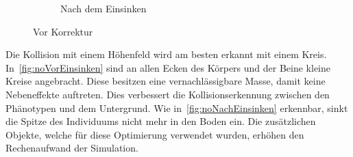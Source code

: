 \begin{figure}[H]
\begin{subfigure}[b]{0.45\textwidth}
          \caption{Nach dem Einsinken\label{fig:nachEinsinken}}
        \end{subfigure}
        \caption{Vor Korrektur}
      \end{figure}

      Die Kollision mit einem Höhenfeld wird am besten erkannt mit einem Kreis.
      In~\vref{fig:noVorEinsinken} sind an allen Ecken des Körpers und der Beine kleine Kreise angebracht.
      Diese besitzen eine vernachlässigbare Masse, damit keine Nebeneffekte auftreten.
      Dies verbessert die Kollisionserkennung zwischen den Phänotypen und dem Untergrund.
      Wie in~\vref{fig:noNachEinsinken} erkennbar, sinkt die Spitze des Individuums nicht mehr in den Boden ein.
      Die zusätzlichen Objekte, welche für diese Optimierung verwendet wurden,
      erhöhen den Rechenaufwand der Simulation.

